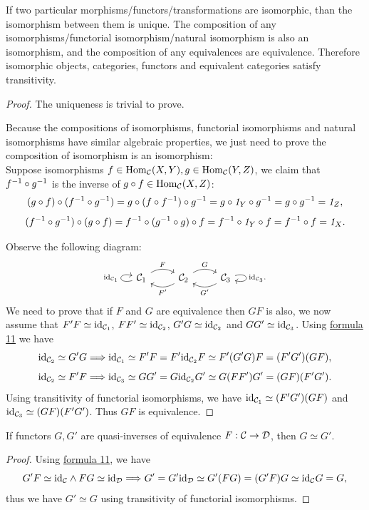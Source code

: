\documentclass{article}
\begin{document}
\begin{thm}\label{transitivity}
	If two particular morphisms/functors/transformations are isomorphic, than the isomorphism between them is unique. The composition of any isomorphisms/functorial isomorphism/natural isomorphism is also an isomorphism, and the composition of any equivalences are equivalence. Therefore isomorphic objects, categories, functors and equivalent categories satisfy transitivity.
\end{thm}

\begin{proof}
	The uniqueness is trivial to prove.
	
	Because the compositions of isomorphisms, functorial isomorphisms and natural isomorphisms have similar algebraic properties, we just need to prove the composition of isomorphism is an isomorphism:\\
	Suppose isomorphisms $f\in\mathrm{Hom}_{\mathcal{C}}(X,Y),g\in\mathrm{Hom}_{\mathcal{C}}(Y,Z)$, we claim that $f^{-1}\circ g^{-1}$ is the inverse of $g\circ f\in\mathrm{Hom}_{\mathcal{C}}(X,Z)$:
		$$(g\circ f)\circ(f^{-1}\circ g^{-1})=g\circ(f\circ f^{-1})\circ g^{-1}=g\circ\mathit{1}_Y
		\circ g^{-1}=g\circ g^{-1}=\mathit{1}_Z,$$
		$$(f^{-1}\circ g^{-1})\circ(g\circ f)=f^{-1}\circ(g^{-1}\circ g)\circ f=f^{-1}\circ\mathit{1}_Y
		\circ f=f^{-1}\circ f=\mathit{1}_X.$$
	
	Observe the following diagram:
	\[\begin{tikzcd}
			\ca_1\arrow[loop left, "\id_{\ca_1}"]\arrow[bend left=30, r, "F"] &
			\ca_2 \arrow[bend left=30, l, "F'"] \arrow[bend left=30, r, "G"] &
			\ca_3 \arrow[bend left=30, l, "G'"] \arrow[loop right, "\id_{\ca_3}."]
		\end{tikzcd}\]
	We need to prove that if $F$ and $G$ are equivalence then $GF$ is also, we now assume that $F'F\simeq\mathrm{id}_{\mathcal{C}_1}$, $FF'\simeq\mathrm{id}_{\mathcal{C}_2}$, $G'G\simeq\mathrm{id}_{\mathcal{C}_2}$ and $GG'\simeq\mathrm{id}_{\mathcal{C}_3}$. Using \hyperref[5]{formula 11} we have
	$$\mathrm{id}_{\mathcal{C}_2}\simeq G'G\Longrightarrow\mathrm{id}_{\mathcal{C}_1}\simeq F'F=F'\mathrm{id}_{\mathcal{C}_2}F\simeq F'(G'G)F=(F'G')(GF),$$
	$$\mathrm{id}_{\mathcal{C}_2}\simeq F'F\Longrightarrow\mathrm{id}_{\mathcal{C}_3}\simeq GG'=G\mathrm{id}_{\mathcal{C}_2}G'\simeq G(FF')G'=(GF)(F'G').$$
	Using transitivity of functorial isomorphisms, we have $\mathrm{id}_{\mathcal{C}_1}\simeq(F'G')(GF)$ and $\mathrm{id}_{\mathcal{C}_3}\simeq(GF)(F'G')$. Thus $GF$ is equivalence.
\end{proof}


\begin{cor}
	If functors $G,G'$ are quasi-inverses of equivalence $F:\mathcal{C}\to\mathcal{D}$, then $G\simeq G'$.
\end{cor}

\begin{proof}
	Using \hyperref[5]{formula 11}, we have
	\[G'F\simeq\mathrm{id}_{\mathcal{C}}\wedge FG\simeq\mathrm{id}_{\mathcal{D}}\Longrightarrow G'=G'\mathrm{id}_{\mathcal{D}}\simeq G'(FG)=(G'F)G\simeq\mathrm{id}_{\mathcal{C}} G=G,\]
	thus we have $G'\simeq G$ using transitivity of functorial isomorphisms.
\end{proof}
\end{document}
